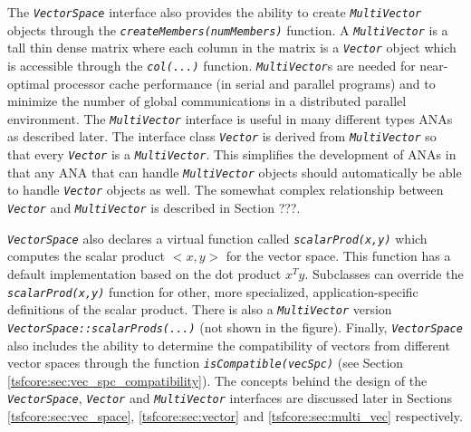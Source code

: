 The {}\texttt{\textit{VectorSpace}} interface also provides the
ability to create {}\texttt{\textit{Multi\-Vector}} objects through
the {}\texttt{\textit{createMembers(numMembers)}} function.  A
{}\texttt{\textit{Multi\-Vector}} is a tall thin dense matrix where
each column in the matrix is a {}\texttt{\textit{Vector}} object which
is accessible through the {}\texttt{\textit{col(...)}} function.
{}\texttt{\textit{Multi\-Vector}}s are needed for near-optimal
processor cache performance (in serial and parallel programs) and to
minimize the number of global communications in a distributed parallel
environment.  The {}\texttt{\textit{Multi\-Vector}} interface is
useful in many different types ANAs as described later.  The interface
class {}\texttt{\textit{Vector}} is derived from
{}\texttt{\textit{Multi\-Vector}} so that every
{}\texttt{\textit{Vector}} is a {}\texttt{\textit{Multi\-Vector}}.
This simplifies the development of ANAs in that any ANA that can
handle {}\texttt{\textit{Multi\-Vector}} objects should automatically
be able to handle {}\texttt{\textit{Vector}} objects as well.  The
somewhat complex relationship between {}\texttt{\textit{Vector}} and
{}\texttt{\textit{Multi\-Vector}} is described in Section ???.

{}\texttt{\textit{VectorSpace}} also declares a virtual function called
{}\texttt{\textit{scalarProd(x,y)}} which computes the scalar product
$<x,y>$ for the vector space. This function has a default implementation
based on the dot product $x^T y$.  Subclasses can override the
{}\texttt{\textit{scalarProd(x,y)}} function for other, more
specialized, application-specific definitions of the scalar
product. There is also a {}\texttt{\textit{Multi\-Vector}} version
{}\texttt{\textit{VectorSpace\-::scalarProds(...)}} (not shown in the
figure).  Finally, {}\texttt{\textit{VectorSpace}} also includes the
ability to determine the compatibility of vectors from different
vector spaces through the function
{}\texttt{\textit{isCompatible(vecSpc)}} (see Section
{}\ref{tsfcore:sec:vec_spc_compatibility}).  The concepts behind the
design of the {}\texttt{\textit{VectorSpace}},
{}\texttt{\textit{Vector}} and {}\texttt{\textit{Multi\-Vector}}
interfaces are discussed later in Sections
{}\ref{tsfcore:sec:vec_space}, {}\ref{tsfcore:sec:vector} and
{}\ref{tsfcore:sec:multi_vec} respectively.

